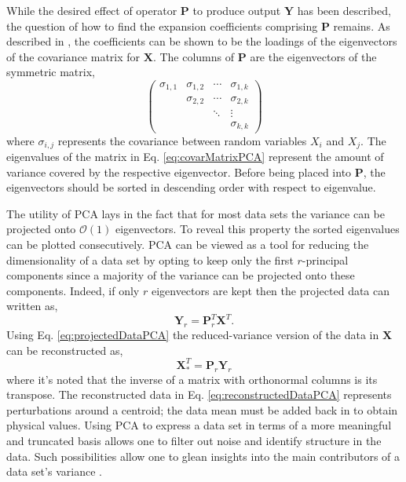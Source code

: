 While the desired effect of operator $\textbf{P}$ to produce output $\textbf{Y}$ has been described, the question of how to find the expansion coefficients comprising $\textbf{P}$ remains. As described in \cite{Shlens}, the coefficients can be shown to be the loadings of the eigenvectors of the covariance matrix for $\textbf{X}$. The columns of $\textbf{P}$ are the eigenvectors of the symmetric matrix, 
\begin{equation}
\label{eq:covarMatrixPCA}
  \begin{pmatrix}
   \sigma_{1,1} & \sigma_{1,2} & \cdots & \sigma_{1,k} \\
                  & \sigma_{2,2} & \cdots & \sigma_{2,k} \\
                  &                 & \ddots & \vdots        \\
                  &                 &          & \sigma_{k,k}
  \end{pmatrix}
\end{equation}
where $\sigma_{i,j}$ represents the covariance between random variables $X_i$ and $X_j$. The eigenvalues of the matrix in Eq. \ref{eq:covarMatrixPCA} represent the amount of variance covered by the respective eigenvector. Before being placed into $\textbf{P}$, the eigenvectors should be sorted in descending order with respect to eigenvalue. 

The utility of \ac{PCA} lays in the fact that for most data sets the variance can be projected onto $\mathcal{O}(1)$ eigenvectors. To reveal this property the sorted eigenvalues can be plotted consecutively. \ac{PCA} can be viewed as a tool for reducing the dimensionality of a data set by opting to keep only the first $r$-principal components since a majority of the variance can be projected onto these components. Indeed, if only $r$ eigenvectors are kept then the projected data can written as,
\begin{equation}
\label{eq:projectedDataPCA}
 \textbf{Y}_r = \textbf{P}_r^T \textbf{X}^T.
\end{equation} 
Using Eq. \ref{eq:projectedDataPCA} the reduced-variance version of the data in $\textbf{X}$ can be reconstructed as,
\begin{equation}
\label{eq:reconstructedDataPCA}
 \textbf{X}_*^T = \textbf{P}_r \textbf{Y}_r
\end{equation} 
where it's noted that the inverse of a matrix with orthonormal columns is its transpose. The reconstructed data in Eq. \ref{eq:reconstructedDataPCA} represents perturbations around a centroid; the data mean must be added back in to obtain physical values. Using \ac{PCA} to express a data set in terms of a more meaningful and truncated basis allows one to filter out noise and identify structure in the data. Such possibilities allow one to glean insights into the main contributors of a data set's variance \cite{Bisgaard}.  

